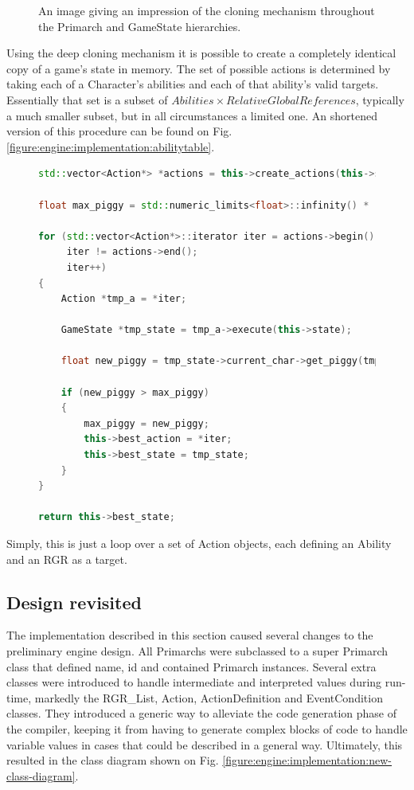 \begin{figure}
\caption{\label{figure:implementation:engine:cloning}An image giving an impression of the cloning mechanism throughout the Primarch and GameState hierarchies.}
\end{figure}

Using the deep cloning mechanism it is possible to create a completely identical copy of a game's state in memory. The set of possible actions is determined by taking each of a Character's abilities and each of that ability's valid targets. Essentially that set is a subset of $Abilities \times RelativeGlobalReferences$, typically a much smaller subset, but in all circumstances a limited one. An shortened version of this procedure can be found on Fig. \ref{figure:engine:implementation:abilitytable}.

\begin{figure}
\begin{lstlisting}[language=C++]
std::vector<Action*> *actions = this->create_actions(this->state->current_char);

float max_piggy = std::numeric_limits<float>::infinity() * -1;

for (std::vector<Action*>::iterator iter = actions->begin();
     iter != actions->end();
     iter++)
{
    Action *tmp_a = *iter;

	GameState *tmp_state = tmp_a->execute(this->state);

	float new_piggy = tmp_state->current_char->get_piggy(tmp_state);

	if (new_piggy > max_piggy)
	{
		max_piggy = new_piggy;
		this->best_action = *iter;
		this->best_state = tmp_state;
	}
}

return this->best_state;
\end{lstlisting}
\end{figure}

Simply, this is just a loop over a set of Action objects, each defining an Ability and an RGR as a target.

\subsection{Design revisited}
The implementation described in this section caused several changes to the preliminary engine design. All Primarchs were subclassed to a super Primarch class that defined name, id and contained Primarch instances. Several extra classes were introduced to handle intermediate and interpreted values during run-time, markedly the RGR\_List, Action, ActionDefinition and EventCondition classes. They introduced a generic way to alleviate the code generation phase of the compiler, keeping it from having to generate complex blocks of code to handle variable values in cases that could be described in a general way. Ultimately, this resulted in the class diagram shown on Fig. \ref{figure:engine:implementation:new-class-diagram}.

